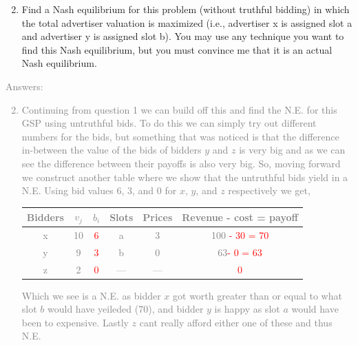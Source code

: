 \documentclass[11pt]{article}
\begin{document}
\begin{enumerate}
	\setcounter{enumi}{1}
	\item  Find a Nash equilibrium for this problem (without truthful bidding) in which the total advertiser valuation is maximized (i.e., advertiser x is assigned slot a and advertiser y is assigned slot b). You may use any technique you want to find this Nash equilibrium, but you must convince me that it is an actual Nash equilibrium.
\end{enumerate}
\textcolor{gray}{
Answers:
\begin{enumerate}
	\setcounter{enumi}{1}
	\item Continuing from question 1 we can build off this and find the N.E. for this GSP using untruthful bids.  To do this we can simply try out different numbers for the bids, but something that was noticed is that the difference in-between the value of the bids of bidders $y$ and $z$ is very big and as we can see the difference between their payoffs is also very big. So, moving forward we construct another table where we show that the untruthful bids yield in a N.E. Using bid values 6, 3, and 0 for $x$, $y$, and $z$ respectively we get,\\
	\begin{center}
		\begin{tabular}{ |c|c|c|c|c|c| } 
			\hline
			Bidders & 	$v_j$ 	& 	$b_i$ 				& 	Slots 	& 	Prices 	&  Revenue - cost = payoff \\
			\hline \hline
			x 	  & 	10 	& 	 \textcolor{red}{6} 	& 	a	& 	 3	&  100\textcolor{red}{ - 30 = 70}\\
			\hline
			y 	  & 	9 	& 	 \textcolor{red}{3} 	& 	b 	& 	 0	&  63\textcolor{red}{- 0 =  63} \\
			\hline
			z 	  & 	2 	& 	 \textcolor{red}{0} 	& 	---	& 	--- 	&  \textcolor{red}{0} \\
			\hline
		\end{tabular}
	\end{center}
Which we see is a N.E. as bidder $x$ got worth greater than or equal to what slot $b$ would have yeileded (70), and bidder $y$ is happy as slot $a$ would have been to expensive.  Lastly $z$ cant really afford either one of these and thus N.E.
\end{enumerate}
}
\end{document}
